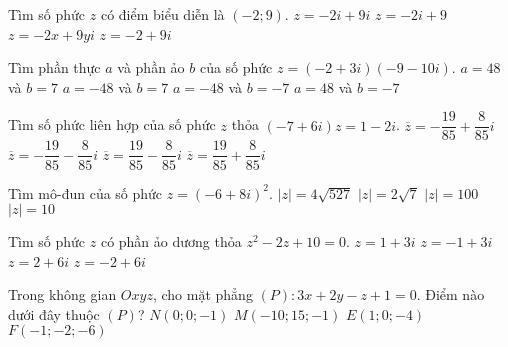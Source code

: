 \begin{ex}%
	Tìm số phức $z$ có điểm biểu diễn là $(-2;9)$.
	\choice
	{$z=-2i+9i $}
	{$z=-2i+9 $}
	{$z=-2x+9yi $}
	{\True $z=-2+9i $}
\end{ex}

\begin{ex}%
	Tìm phần thực $ a $ và phần ảo $ b $ của số phức $ z=(-2+3i)(-9-10i) $.
	\choice
	{$ a=48 $ và $ b=7 $}
	{$ a=-48 $ và $ b=7 $}
	{$ a=-48 $ và $ b=-7 $}
	{\True $ a=48 $ và $ b=-7 $}
\end{ex}
\begin{ex}%
	Tìm số phức liên hợp của số phức $ z $ thỏa $ (-7+6i)z=1-2i $.
	\choice
	{$ \overline{z}=-\dfrac{19}{85}+\dfrac{8}{85}i $}
	{\True $ \overline{z}=-\dfrac{19}{85}-\dfrac{8}{85}i  $}
	{$ \overline{z}=\dfrac{19}{85}-\dfrac{8}{85}i $}
	{$ \overline{z}=\dfrac{19}{85}+\dfrac{8}{85}i $}
\end{ex}
\begin{ex}%
	Tìm mô-đun của số phức $ z=(-6+8i)^2 $.
	\choice
	{$ |z|=4\sqrt{527} $}
	{$ |z|=2\sqrt{7} $}
	{\True $ |z|=100 $}
	{$ |z|=10 $}
\end{ex}
\begin{ex}%
	Tìm số phức $ z $ có phần ảo dương thỏa $ z^2-2z+10=0 $.
	\choice
	{\True $ z=1+3i $}
	{$ z=-1+3i $}
	{$ z=2+6i $}
	{$ z=-2+6i $}
\end{ex}
\begin{ex}%
	Trong không gian $ Oxyz $, cho mặt phẳng $ (P) \colon 3x+2y-z+1=0 $. Điểm nào dưới đây thuộc $ (P) $?
	\choice
	{$ N(0;0;-1) $}
	{$ M(-10;15;-1) $}
	{$ E(1;0;-4) $}
	{\True $ F(-1;-2;-6) $}
\end{ex}

